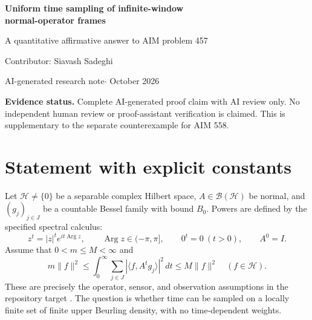 \documentclass[11pt]{article}
\newcommand{\HH}{\mathcal H}
\DeclareMathOperator{\Arg}{Arg}
\begin{document}
\thispagestyle{plain}
\begin{center}
{\Large\bfseries Uniform time sampling of infinite-window\\[3pt]
normal-operator frames\par}
\vspace{8pt}
{\normalsize A quantitative affirmative answer to AIM problem 457\par}
\vspace{10pt}
{\normalsize Contributor: Siavash Sadeghi\par}
\vspace{4pt}
{\small AI-generated research note\quad$\cdot$ October 2026\par}
\end{center}
\begin{abstract}
Under the assumptions of AIM problem 457, every sufficiently fine uniform time grid gives an unweighted frame on the infinite observation window. The Bessel hypothesis on the initial sensors and the continuous lower frame bound force the normal evolution operator to be bounded away from zero. Its specified Borel logarithm is consequently bounded. Applying the continuous upper frame bound to the logarithmic generator controls the time derivative of the observation map in $L^2$. A direct step-function approximation then supplies a uniform sampling grid and explicit frame bounds, without exponential stability.
\end{abstract}
\textbf{Evidence status.} Complete AI-generated proof claim with AI review only. No independent human review or proof-assistant verification is claimed. This is supplementary to the separate counterexample for AIM 558.

\section{Statement with explicit constants}
Let $\HH\ne\{0\}$ be a separable complex Hilbert space, $A\in\mathcal B(\HH)$ be normal, and $(g_j)_{j\in J}$ be a countable Bessel family with bound $B_0$. Powers are defined by the specified spectral calculus:
\[
z^t=|z|^t e^{it\Arg z},\qquad \Arg z\in(-\pi,\pi],\qquad
0^t=0\ (t>0),\qquad A^0=I.
\]
Assume that $0<m\leq M<\infty$ and
\begin{equation}\label{eq:continuous}
m\|f\|^2\leq\int_0^\infty\sum_{j\in J}|\langle f,A^tg_j\rangle|^2\,dt
\leq M\|f\|^2\quad(f\in\HH).
\end{equation}
These are precisely the operator, sensor, and observation assumptions in the repository target \cite{aim}. The question is whether time can be sampled on a locally finite set of finite upper Beurling density, with no time-dependent weights.
\end{document}
